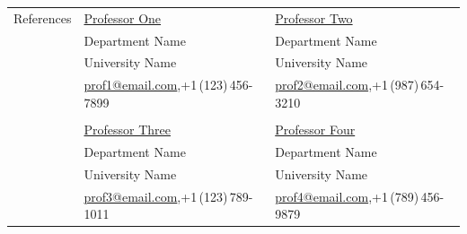 \documentclass[10pt]{article}
\begin{document}
\newpage



\noindent \begin{tabular}{@{} l l l}
 \Large{References} & \href{http://www.professorone.com}{Professor One} & \href{http://www.professortwo.com}{Professor Two} \\
 & Department Name &  Department Name  \\
 & University Name &  University Name \\
 & \small{\href{mailto:prof1@email.com}{prof1@email.com},+1\,(123)\,456-7899} & \small{\href{mailto:prof2@email.com}{prof2@email.com},+1\,(987)\,654-3210} \\
&& \\
 & \href{http://www.professorthree.com}{Professor Three} & \href{http://www.professorfour.com}{Professor Four}  \\
 & Department Name &  Department Name \\
 & University Name &  University Name \\
 & \small{\href{mailto:prof3@email.com}{prof3@email.com},+1\,(123)\,789-1011} & \small{\href{mailto:prof4@email.com}{prof4@email.com},+1\,(789)\,456-9879} \\
\end{tabular}



\clearpage
\setlength\parindent{0cm}
\end{document}
